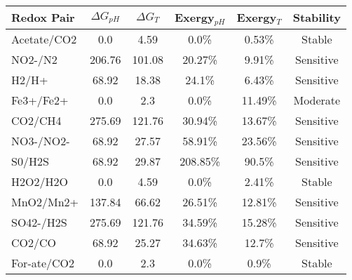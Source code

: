 \begin{tabular}{lccccc}
\toprule
Redox Pair & $\Delta G_{pH}$ & $\Delta G_T$ & Exergy$_{pH}$ & Exergy$_T$ & Stability \\ 
\midrule
Acetate/CO2 & 0.0 & 4.59 & 0.0\% & 0.53\% & Stable \\ 
NO2-/N2 & 206.76 & 101.08 & 20.27\% & 9.91\% & Sensitive \\ 
H2/H+ & 68.92 & 18.38 & 24.1\% & 6.43\% & Sensitive \\ 
Fe3+/Fe2+ & 0.0 & 2.3 & 0.0\% & 11.49\% & Moderate \\ 
CO2/CH4 & 275.69 & 121.76 & 30.94\% & 13.67\% & Sensitive \\ 
NO3-/NO2- & 68.92 & 27.57 & 58.91\% & 23.56\% & Sensitive \\ 
S0/H2S & 68.92 & 29.87 & 208.85\% & 90.5\% & Sensitive \\ 
H2O2/H2O & 0.0 & 4.59 & 0.0\% & 2.41\% & Stable \\ 
MnO2/Mn2+ & 137.84 & 66.62 & 26.51\% & 12.81\% & Sensitive \\ 
SO42-/H2S & 275.69 & 121.76 & 34.59\% & 15.28\% & Sensitive \\ 
CO2/CO & 68.92 & 25.27 & 34.63\% & 12.7\% & Sensitive \\ 
For-ate/CO2 & 0.0 & 2.3 & 0.0\% & 0.9\% & Stable \\ 
\bottomrule
\end{tabular}
